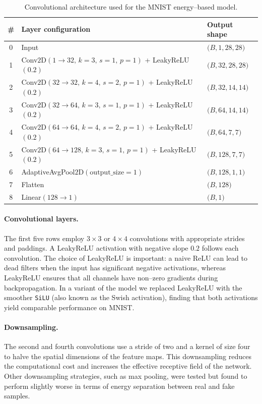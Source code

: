 \begin{table}[H]
    \centering
    \caption{Convolutional architecture used for the MNIST energy–based model.}
    \label{tab:ebm-arch}
    \begin{tabular}{cll}
        \toprule
        \# & Layer configuration & Output shape \\
        \midrule
        0 & Input & $\bigl(B,1,28,28\bigr)$ \\
        1 & Conv$2$D$(1\to 32,\,k=3,\,s=1,\,p=1)$ + LeakyReLU$(0.2)$ & $\bigl(B,32,28,28\bigr)$ \\
        2 & Conv$2$D$(32\to 32,\,k=4,\,s=2,\,p=1)$ + LeakyReLU$(0.2)$ & $\bigl(B,32,14,14\bigr)$ \\
        3 & Conv$2$D$(32\to 64,\,k=3,\,s=1,\,p=1)$ + LeakyReLU$(0.2)$ & $\bigl(B,64,14,14\bigr)$ \\
        4 & Conv$2$D$(64\to 64,\,k=4,\,s=2,\,p=1)$ + LeakyReLU$(0.2)$ & $\bigl(B,64,7,7\bigr)$ \\
        5 & Conv$2$D$(64\to 128,\,k=3,\,s=1,\,p=1)$ + LeakyReLU$(0.2)$ & $\bigl(B,128,7,7\bigr)$ \\
        6 & AdaptiveAvgPool$2$D$(\text{output\_size}=1)$ & $\bigl(B,128,1,1\bigr)$ \\
        7 & Flatten & $\bigl(B,128\bigr)$ \\
        8 & Linear$(128\to 1)$ & $\bigl(B,1\bigr)$ \\
        \bottomrule
    \end{tabular}
\end{table}

\paragraph{Convolutional layers.}
The first five rows employ $3\times 3$ or $4\times 4$ convolutions with
appropriate strides and paddings.  A LeakyReLU activation with negative
slope $0.2$ follows each convolution.  The choice of LeakyReLU is
important: a naive ReLU can lead to dead filters when the input has
significant negative activations, whereas LeakyReLU ensures that all
channels have non–zero gradients during backpropagation.  In a variant of
the model we replaced LeakyReLU with the smoother \texttt{SiLU} (also
known as the Swish activation), finding that both activations yield
comparable performance on MNIST.

\paragraph{Downsampling.}
The second and fourth convolutions use a stride of two and a kernel of
size four to halve the spatial dimensions of the feature maps.  This
downsampling reduces the computational cost and increases the effective
receptive field of the network.  Other downsampling strategies, such as
max pooling, were tested but found to perform slightly worse in terms of
energy separation between real and fake samples.

